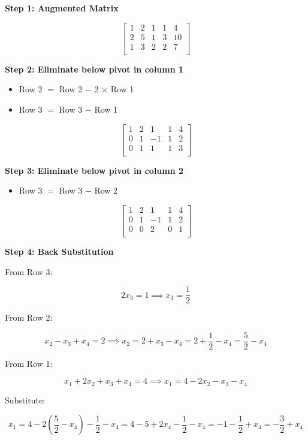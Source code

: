 \textbf{Step 1: Augmented Matrix}

\[
    \begin{bmatrix}
        1 & 2 & 1 & 1 & 4  \\
        2 & 5 & 1 & 3 & 10 \\
        1 & 3 & 2 & 2 & 7  \\
    \end{bmatrix}
\]

\textbf{Step 2: Eliminate below pivot in column 1}

\begin{itemize}
    \item Row 2 \(=\) Row 2 \(-\) 2 \(\times\) Row 1
    \item Row 3 \(=\) Row 3 \(-\) Row 1
\end{itemize}

\[
    \begin{bmatrix}
        1 & 2 & 1  & 1 & 4 \\
        0 & 1 & -1 & 1 & 2 \\
        0 & 1 & 1  & 1 & 3 \\
    \end{bmatrix}
\]

\textbf{Step 3: Eliminate below pivot in column 2}

\begin{itemize}
    \item Row 3 \(=\) Row 3 \(-\) Row 2
\end{itemize}

\[
    \begin{bmatrix}
        1 & 2 & 1  & 1 & 4 \\
        0 & 1 & -1 & 1 & 2 \\
        0 & 0 & 2  & 0 & 1 \\
    \end{bmatrix}
\]

\textbf{Step 4: Back Substitution}

From Row 3:

\[
    2x_3 = 1 \implies x_3 = \frac{1}{2}
\]

From Row 2:

\[
    x_2 - x_3 + x_4 = 2 \implies x_2 = 2 + x_3 - x_4 = 2 + \frac{1}{2} - x_4 = \frac{5}{2} - x_4
\]

From Row 1:

\[
    x_1 + 2x_2 + x_3 + x_4 = 4
    \implies x_1 = 4 - 2x_2 - x_3 - x_4
\]

Substitute:

\[
    x_1 = 4 - 2\left( \frac{5}{2} - x_4 \right) - \frac{1}{2} - x_4
    = 4 - 5 + 2x_4 - \frac{1}{2} - x_4
    = -1 - \frac{1}{2} + x_4 = -\frac{3}{2} + x_4
\]

